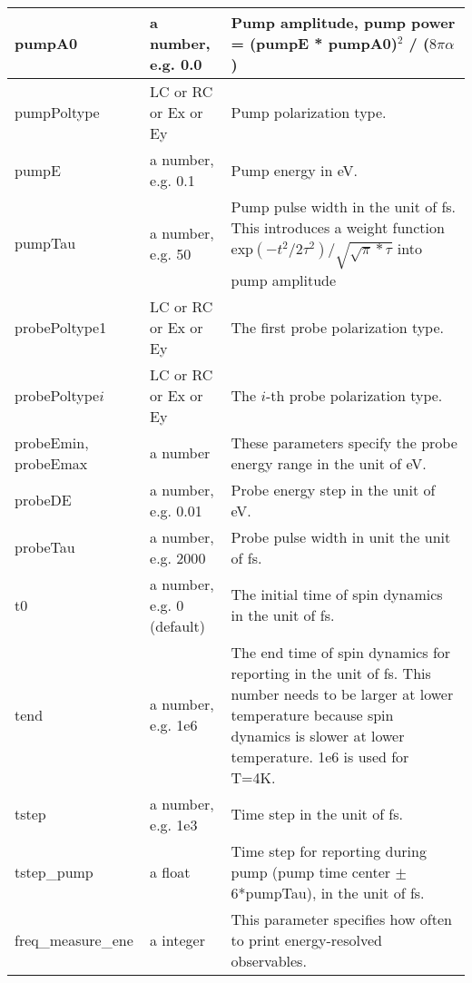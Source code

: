 \documentclass{article}
\begin{document}
\begin{xltabular}{\textwidth}{X X X}
		pumpA0 & a number, e.g. 0.0 & Pump amplitude, pump power = (pumpE * pumpA0)$^2$ / ($8\pi \alpha$)\\
		\midrule
		
		pumpPoltype & LC or RC or Ex or Ey & Pump polarization type.\\
		\midrule
		
		pumpE & a number, e.g. 0.1 & Pump energy in eV.\\
		\midrule
		
		pumpTau & a number, e.g. 50 & Pump pulse width in the unit of fs. This introduces a weight function $\mathrm{exp}(-t^2/2\tau^2) / \sqrt{\sqrt{\pi} * \tau}$ into pump amplitude\\
		\midrule
		
		probePoltype1 & LC or RC or Ex or Ey & The first probe polarization type.\\
		\midrule
		
		probePoltype$i$ & LC or RC or Ex or Ey & The $i$-th probe polarization type.\\
		\midrule
		
		probeEmin, probeEmax & a number & These parameters specify the probe energy range in the unit of eV.\\
		\midrule
		
		probeDE & a number, e.g. 0.01 & Probe energy step in the unit of eV.\\
		\midrule
		
		probeTau & a number, e.g. 2000 & Probe pulse width in unit the unit of fs.\\
		\midrule\midrule
		
		t0 & a number, e.g. 0 (default) & The initial time of spin dynamics in the unit of fs.\\
		\midrule
		
		tend & a number, e.g. 1e6 & The end time of spin dynamics for reporting in the unit of fs. This number needs to be larger at lower temperature because spin dynamics is slower at lower temperature. 1e6 is used for T=4K.\\
		\midrule
		
		tstep & a number, e.g. 1e3 & Time step in the unit of fs.\\
		\midrule
		
		tstep\_pump & a float & Time step for reporting during pump (pump time center $\pm$6*pumpTau), in the unit of fs.\\
		\midrule
		
		freq\_measure\_ene & a integer & This parameter specifies how often to print energy-resolved observables.\\
		\midrule
		

\end{xltabular}
\end{document}
